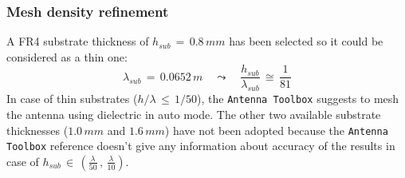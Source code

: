 \documentclass[12pt,a4paper]{article}
\begin{document}
{\subsubsection*{\selectfont\color{Turquoise}Mesh density refinement}
A FR4 substrate thickness of $h_{sub}\,=\,0.8\,mm$  has been selected so it could be considered as a thin one:
\[\lambda_{sub}\,=\,0.0652\,m\quad \leadsto\quad \frac{h_{sub}}{\lambda_{sub}}\,\cong\,\frac{1}{81}\]
In case of thin substrates ($h/\lambda\,\leq\,1/50$),  the \texttt{\color{Mahogany}Antenna Toolbox} suggests to mesh the antenna using dielectric in auto mode. The other two available substrate thicknesses ($1.0\,mm$ and $1.6\,mm$) have not been adopted because the \texttt{\color{Mahogany}Antenna Toolbox} reference doesn't give any information about accuracy of the results in case of $h_{sub}\,\in\,\left(\frac{\lambda}{50}\,,\,\frac{\lambda}{10}\right)$. 

}
\end{document}
